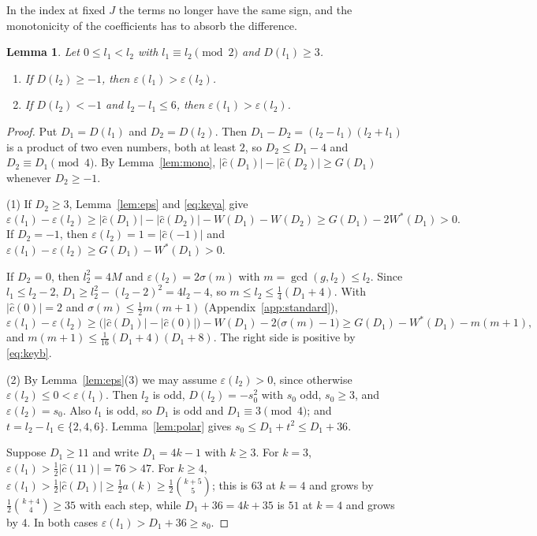 \documentclass[11pt]{amsart}
\newtheorem{lemma}[theorem]{Lemma}
\theoremstyle{definition}
\newcommand{\cc}{\hat c}
\begin{document}
In the index at fixed $J$ the terms no longer have the same sign, and the monotonicity of the coefficients has to absorb the difference.

\begin{lemma}\label{lem:pair}
Let $0\le l_1<l_2$ with $l_1\equiv l_2\pmod 2$ and $D(l_1)\ge3$.
\begin{enumerate}
\item If $D(l_2)\ge-1$, then $\varepsilon(l_1)>\varepsilon(l_2)$.
\item If $D(l_2)<-1$ and $l_2-l_1\le6$, then $\varepsilon(l_1)>\varepsilon(l_2)$.
\end{enumerate}
\end{lemma}

\begin{proof}
Put $D_1=D(l_1)$ and $D_2=D(l_2)$. Then $D_1-D_2=(l_2-l_1)(l_2+l_1)$ is a product of two even numbers, both at least $2$, so $D_2\le D_1-4$ and $D_2\equiv D_1\pmod 4$. By Lemma~\ref{lem:mono}, $|\cc(D_1)|-|\cc(D_2)|\ge G(D_1)$ whenever $D_2\ge-1$.

(1) If $D_2\ge3$, Lemma~\ref{lem:eps} and \eqref{eq:keya} give
\[
\varepsilon(l_1)-\varepsilon(l_2)\ge|\cc(D_1)|-|\cc(D_2)|-W(D_1)-W(D_2)\ge G(D_1)-2W^*(D_1)>0 .
\]
If $D_2=-1$, then $\varepsilon(l_2)=1=|\cc(-1)|$ and $\varepsilon(l_1)-\varepsilon(l_2)\ge G(D_1)-W^*(D_1)>0$.

If $D_2=0$, then $l_2^2=4M$ and $\varepsilon(l_2)=2\sigma(m)$ with $m=\gcd(g,l_2)\le l_2$. Since $l_1\le l_2-2$, $D_1\ge l_2^2-(l_2-2)^2=4l_2-4$, so $m\le l_2\le\frac14(D_1+4)$. With $|\cc(0)|=2$ and $\sigma(m)\le\frac12m(m+1)$ (Appendix~\ref{app:standard}),
\[
\varepsilon(l_1)-\varepsilon(l_2)\ge\bigl(|\cc(D_1)|-|\cc(0)|\bigr)-W(D_1)-2\bigl(\sigma(m)-1\bigr)\ge G(D_1)-W^*(D_1)-m(m+1),
\]
and $m(m+1)\le\frac1{16}(D_1+4)(D_1+8)$. The right side is positive by \eqref{eq:keyb}.

(2) By Lemma~\ref{lem:eps}(3) we may assume $\varepsilon(l_2)>0$, since otherwise $\varepsilon(l_2)\le0<\varepsilon(l_1)$. Then $l_2$ is odd, $D(l_2)=-s_0^2$ with $s_0$ odd, $s_0\ge3$, and $\varepsilon(l_2)=s_0$. Also $l_1$ is odd, so $D_1$ is odd and $D_1\equiv3\pmod4$; and $t=l_2-l_1\in\{2,4,6\}$. Lemma~\ref{lem:polar} gives $s_0\le D_1+t^2\le D_1+36$.

Suppose $D_1\ge11$ and write $D_1=4k-1$ with $k\ge3$. For $k=3$, $\varepsilon(l_1)>\frac12|\cc(11)|=76>47$. For $k\ge4$, $\varepsilon(l_1)>\frac12|\cc(D_1)|\ge\frac12a(k)\ge\frac12\binom{k+5}5$; this is $63$ at $k=4$ and grows by $\frac12\binom{k+4}4\ge35$ with each step, while $D_1+36=4k+35$ is $51$ at $k=4$ and grows by $4$. In both cases $\varepsilon(l_1)>D_1+36\ge s_0$.


\end{proof}
\end{document}
